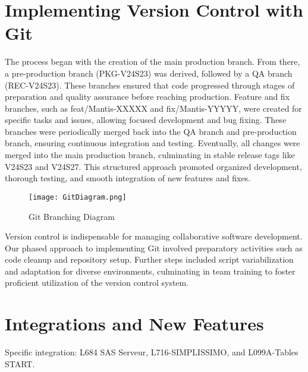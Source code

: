 \section{Implementing Version Control with Git}

The process began with the creation of the main production branch. From there, a pre-production branch (PKG-V24S23) was derived, followed by a QA branch (REC-V24S23). These branches ensured that code progressed through stages of preparation and quality assurance before reaching production. Feature and fix branches, such as feat/Mantis-XXXXX and fix/Mantis-YYYYY, were created for specific tasks and issues, allowing focused development and bug fixing. These branches were periodically merged back into the QA branch and pre-production branch, ensuring continuous integration and testing. Eventually, all changes were merged into the main production branch, culminating in stable release tags like V24S23 and V24S27. This structured approach promoted organized development, thorough testing, and smooth integration of new features and fixes.

\begin{figure}
    \centering
    \texttt{[image: GitDiagram.png]}
    \caption{Git Branching Diagram}
    \label{fig:git-diagram}
\end{figure}



Version control is indispensable for managing collaborative software development. Our phased approach to implementing Git involved preparatory activities such as code cleanup and repository setup. Further steps included script variabilization and adaptation for diverse environments, culminating in team training to foster proficient utilization of the version control system.

\section{Integrations and New Features}

Specific integration: L684 SAS Serveur, L716-SIMPLISSIMO, and L099A-Tables START. 

